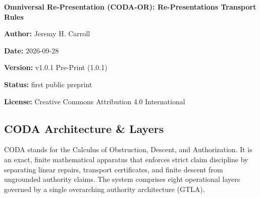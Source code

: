 \documentclass[
  11pt,
]{article}
\begin{document}
\begin{center}
{\Large\bfseries Omniversal Re-Presentation (CODA-OR): Re-Presentations Transport Rules}\par

\textbf{Author:} Jeremy H. Carroll

\textbf{Date:} 2026-09-28

\textbf{Version:} v1.0.1 Pre-Print (1.0.1)

\textbf{Status:} first public preprint

\textbf{License:} Creative Commons Attribution 4.0 International

\end{center}

\subsection{CODA Architecture \& Layers}\label{coda-architecture-layers}

CODA stands for the Calculus of Obstruction, Descent, and Authorization. It is an exact, finite mathematical apparatus that enforces strict claim discipline by separating linear repairs, transport certificates, and finite descent from ungrounded authority claims. The system comprises eight operational layers governed by a single overarching authority architecture (GTLA).
\end{document}
